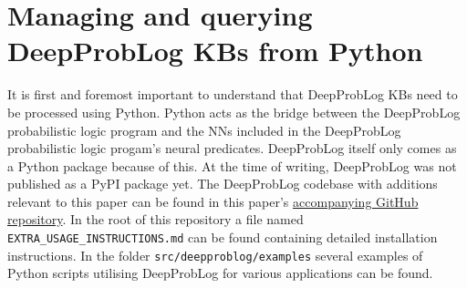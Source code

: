 \section{Managing and querying DeepProbLog KBs from Python}
\label{managing_querying_DeepProbLog_from_python}
It is first and foremost important to understand that DeepProbLog KBs need to be processed using Python. Python acts as the bridge between the DeepProbLog probabilistic logic program and the NNs included in the DeepProbLog probabilistic logic progam's neural predicates. DeepProbLog itself only comes as a Python package because of this. At the time of writing, DeepProbLog was not published as a PyPI package yet. The DeepProbLog codebase with additions relevant to this paper can be found in this paper's \href{https://github.com/Joshua-Schroijen/deepproblog/tree/master/src/deepproblog/examples}{accompanying GitHub repository}. In the root of this repository a file named \texttt{EXTRA\_USAGE\_INSTRUCTIONS.md} can be found containing detailed installation instructions. In the folder \texttt{src/deepproblog/examples} several examples of Python scripts utilising DeepProbLog for various applications can be found. 

